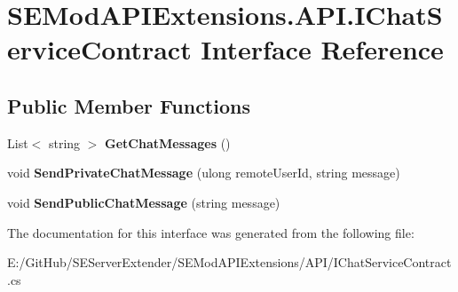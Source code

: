 \hypertarget{interface_s_e_mod_a_p_i_extensions_1_1_a_p_i_1_1_i_chat_service_contract}{}\section{S\+E\+Mod\+A\+P\+I\+Extensions.\+A\+P\+I.\+I\+Chat\+Service\+Contract Interface Reference}
\label{interface_s_e_mod_a_p_i_extensions_1_1_a_p_i_1_1_i_chat_service_contract}
\subsection*{Public Member Functions}
\begin{DoxyCompactItemize}
\item 
\hypertarget{interface_s_e_mod_a_p_i_extensions_1_1_a_p_i_1_1_i_chat_service_contract_a26c9e092689fa3ecd4aedbfb3971052a}{}List$<$ string $>$ {\bfseries Get\+Chat\+Messages} ()\label{interface_s_e_mod_a_p_i_extensions_1_1_a_p_i_1_1_i_chat_service_contract_a26c9e092689fa3ecd4aedbfb3971052a}

\item 
\hypertarget{interface_s_e_mod_a_p_i_extensions_1_1_a_p_i_1_1_i_chat_service_contract_adb9c54f81deac433da2b8b4c79f37b19}{}void {\bfseries Send\+Private\+Chat\+Message} (ulong remote\+User\+Id, string message)\label{interface_s_e_mod_a_p_i_extensions_1_1_a_p_i_1_1_i_chat_service_contract_adb9c54f81deac433da2b8b4c79f37b19}

\item 
\hypertarget{interface_s_e_mod_a_p_i_extensions_1_1_a_p_i_1_1_i_chat_service_contract_af7088e4c8e019f709575bd9381cac6d8}{}void {\bfseries Send\+Public\+Chat\+Message} (string message)\label{interface_s_e_mod_a_p_i_extensions_1_1_a_p_i_1_1_i_chat_service_contract_af7088e4c8e019f709575bd9381cac6d8}

\end{DoxyCompactItemize}


The documentation for this interface was generated from the following file\+:\begin{DoxyCompactItemize}
\item 
E\+:/\+Git\+Hub/\+S\+E\+Server\+Extender/\+S\+E\+Mod\+A\+P\+I\+Extensions/\+A\+P\+I/I\+Chat\+Service\+Contract.\+cs\end{DoxyCompactItemize}
